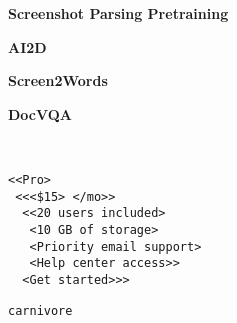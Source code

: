 \documentclass{article} \usepackage[accepted]{icml2023}
\begin{document}
\begin{figure*}[!t]
\centering
\begin{subfigure}[b]{0.36\textwidth}
\centering
\tiny
\textbf{Screenshot Parsing Pretraining}
\end{subfigure}
\begin{subfigure}[b]{0.26\textwidth}
\centering
\tiny
\textbf{AI2D}
\end{subfigure}
\begin{subfigure}[b]{0.19\textwidth}
\centering
\tiny
\textbf{Screen2Words}
\end{subfigure}
\begin{subfigure}[b]{0.15\textwidth}
\centering
\tiny
\textbf{DocVQA}
\end{subfigure}
\begin{subfigure}[b]{0.36\textwidth}
\end{subfigure}
\begin{subfigure}[b]{0.26\textwidth}
\end{subfigure}
\begin{subfigure}[b]{0.19\textwidth}
\end{subfigure}
\begin{subfigure}[b]{0.15\textwidth}
\end{subfigure}
\\[-2ex]
\begin{subfigure}[t]{0.01cm}
\end{subfigure}
\begin{subfigure}[t]{0.36\textwidth}
\small
\begin{snugshade*}
\begin{verbatim}
<<Pro>
 <<<$15> </mo>>
  <<20 users included>
   <10 GB of storage> 
   <Priority email support>
   <Help center access>>
  <Get started>>>
\end{verbatim}
\end{snugshade*}
\end{subfigure}
\begin{subfigure}[t]{0.26\textwidth}
\small
\begin{snugshade*}
\begin{verbatim}
carnivore







\end{verbatim}
\end{snugshade*}
\end{subfigure}
\end{figure*}
\end{document}
